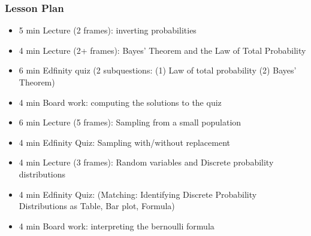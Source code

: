 \begin{frame}
    \frametitle{Lesson Plan}
    \begin{itemize}
        \item 5 min Lecture (2 frames): inverting probabilities
        \item 4 min Lecture (2+ frames): Bayes' Theorem and the Law of Total Probability
        \item 6 min Edfinity quiz (2 subquestions: (1) Law of total probability (2) Bayes' Theorem)
        \item 4 min Board work: computing the solutions to the quiz

        \item 6 min Lecture (5 frames): Sampling from a small population
        \item 4 min Edfinity Quiz: Sampling with/without replacement
        \item 4 min Lecture (3 frames): Random variables and Discrete probability distributions
        \item 4 min Edfinity Quiz: (Matching: Identifying Discrete Probability Distributions as Table, Bar plot, Formula)
        \item 4 min Board work: interpreting the bernoulli formula
        
   \end{itemize}
\end{frame}


